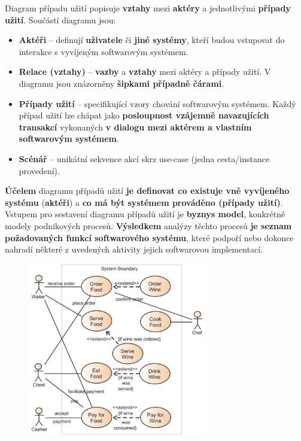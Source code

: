Diagram případu užití popisuje \textbf{vztahy} mezi \textbf{aktéry} a jednotlivými \textbf{případy užití}. Součástí diagramu jsou:
\begin{itemize}
\item \textbf{Aktéři} -- definují \textbf{uživatele} či \textbf{jiné systémy}, kteří budou vstupovat do interakce s vyvíjeným softwarovým systémem.
\item \textbf{Relace (vztahy)} -- \textbf{vazby} a \textbf{vztahy} mezi aktéry a případy užití. V diagramu jsou znázorněny \textbf{šipkami případně čárami}.
\item \textbf{Případy užití} -- specifikující vzory chování  softwarovým systémem.  Každý případ užití lze chápat jako \textbf{posloupnost vzájemně navazujících transakcí} vykonaných \textbf{v dialogu mezi aktérem a vlastním softwarovým systémem}.
\item \textbf{Scénář} -- unikátní sekvence akcí skrz use-case (jedna cesta/instance provedení).
\end{itemize}
\textbf{Účelem} diagramu případů užití \textbf{je definovat co existuje vně vyvíjeného systému} (\textbf{aktéři}) a \textbf{co má být systémem prováděno (případy užití)}. Vstupem pro sestavení diagramu případů užití je \textbf{byznys model}, konkrétně modely podnikových procesů.  \textbf{Výsledkem} analýzy těchto procesů \textbf{je seznam požadovaných funkcí softwarového systému}, které podpoří nebo dokonce nahradí některé z uvedených aktivity jejich softwarovou implementací.

\begin{figure}[H]
	\centering
	\includegraphics[width=0.7\textwidth]{assets/usecase.png}
\end{figure}

